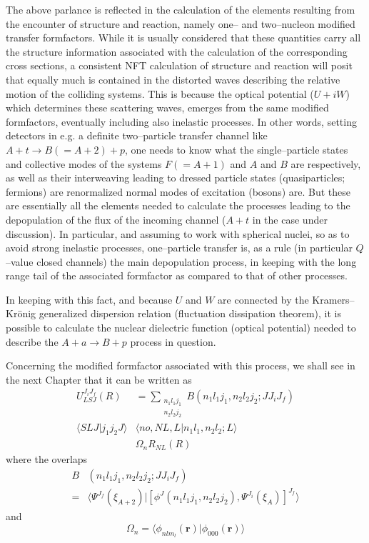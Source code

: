 \documentclass[a4paper,11pt]{book}
\numberwithin{equation}{section}
\numberwithin{figure}{section}
\numberwithin{table}{section}
\begin{document}
The above parlance is reflected in the calculation of the elements resulting from the encounter of structure and reaction, namely one-- and two--nucleon modified transfer formfactors. While it is usually considered that these quantities carry all the structure information associated with the calculation of the corresponding cross sections, a consistent NFT calculation of structure and reaction will posit that equally much is contained in the distorted waves describing the relative motion of the colliding systems. This is because the optical potential ($U+iW$) which determines these scattering waves, emerges from the same modified formfactors, eventually including also inelastic processes. In other words, setting detectors in e.g. a definite two--particle transfer channel like $A+t\rightarrow B(=A+2)+p$, one needs to know what the single--particle states and collective modes of the systems $F(=A+1)$ and $A$ and $B$ are respectively, as well as their interweaving leading to dressed particle states (quasiparticles; fermions) are renormalized normal modes of excitation (bosons) are. But these are essentially all the elements needed to calculate the processes leading to the depopulation of the flux of the incoming channel ($A+t$ in the case under discussion). In particular, and assuming to work with spherical nuclei, so as to avoid strong inelastic processes, one--particle transfer is, as a rule (in particular $Q$--value closed channels) the main depopulation process, in keeping with the long range tail of the associated formfactor as compared to that of other processes. 


In keeping with this fact, and because $U$ and $W$ are connected by the Kramers--Kr\"onig generalized dispersion relation (fluctuation dissipation theorem), it is possible to calculate the nuclear dielectric function (optical potential) needed to describe the $A+a\rightarrow B+p$ process in question.


Concerning the modified formfactor associated with this process, we shall see in the next Chapter that it can be written as
\begin{equation*}
\begin{split}
U_{LSJ}^{J_iJ_f}(R)&=\sum_{\substack{n_1l_1j_1\\n_2l_2j_2}}B(n_1l_1j_1,n_2l_2j_2;JJ_iJ_f)\\
\langle SLJ|j_1j_2J\rangle & \langle no, NL,L|n_1l_1,n_2l_2;L\rangle\\
&\Omega_n R_{NL}(R)
\end{split}
\end{equation*}
where the overlaps
\begin{equation*}
\begin{split}
B&(n_1l_1j_1,n_2l_2j_2;JJ_iJ_f)\\
=&\langle \Psi^{J_f}(\xi_{A+2})|\left[\phi^J(n_1l_1j_1,n_2l_2j_2),\Psi^{J_i}(\xi_A)\right]^{J_f}\rangle
\end{split}
\end{equation*}
and 
\begin{equation*}
\Omega_n=\langle \phi_{nlm_l}(\mathbf r)|\phi_{000}(\mathbf r)\rangle
\end{equation*}
\end{document}
